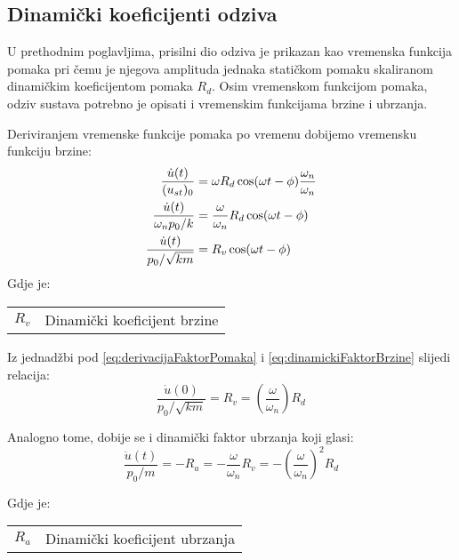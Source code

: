 \subsection{Dinamički koeficijenti odziva}
U prethodnim poglavljima, prisilni dio odziva je prikazan kao vremenska funkcija pomaka
pri čemu je njegova amplituda jednaka statičkom pomaku skaliranom dinamičkim
koeficijentom pomaka $R_d$. Osim vremenskom funkcijom pomaka, odziv sustava potrebno
je opisati i vremenskim funkcijama brzine i ubrzanja.

Deriviranjem vremenske funkcije pomaka po vremenu dobijemo vremensku funkciju brzine:
    \begin{align}
        \frac{\dot{u}(t)}{(u_{st})_0} &= 
            \omega R_d\cos(\omega t - \phi)\frac{\omega_n}{\omega_n}\notag\\
        \frac{\dot{u}(t)}{\omega_n p_0/k} &= 
            \frac{\omega}{\omega_n}R_d\cos(\omega t-\phi)\label{eq:derivacijaFaktorPomaka}\\
        \frac{\dot{u}(t)}{p_0/\sqrt{km}} &=
            R_v\cos(\omega t-\phi)\label{eq:dinamickiFaktorBrzine}
    \end{align}
Gdje je:
\begin{table}[H]
    \begin{tabular}{r l}
        $R_v$ & Dinamički koeficijent brzine\\
    \end{tabular}
\end{table}

Iz jednadžbi pod \eqref{eq:derivacijaFaktorPomaka} i \eqref{eq:dinamickiFaktorBrzine}
slijedi relacija:
\begin{equation}\label{eq:R_v}
    \frac{\dot{u}(0)}{p_0/\sqrt{km}}=R_v=\left(\frac{\omega}{\omega_n}\right)R_d
\end{equation}

Analogno tome, dobije se i dinamički faktor ubrzanja koji glasi:
\begin{equation}\label{eq:R_a}
    \frac{\ddot{u}(t)}{p_0/m}=-R_a=-\frac{\omega}{\omega_n}R_v
        =-\left(\frac{\omega}{\omega_n}\right)^2R_d
\end{equation}

Gdje je:
\begin{table}[H]
    \begin{tabular}{r l}
        $R_a$ & Dinamički koeficijent ubrzanja\\
    \end{tabular}
\end{table}


